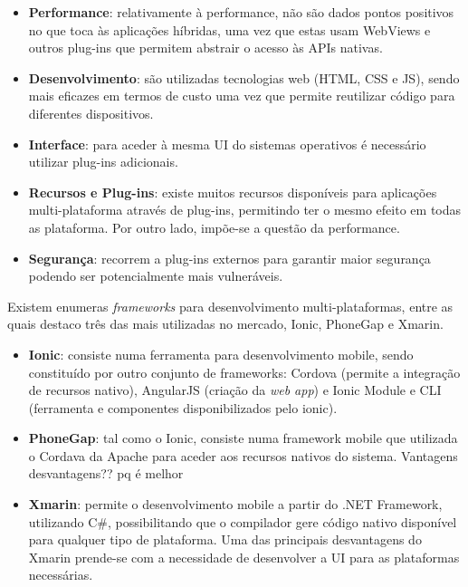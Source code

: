 \begin{itemize}
	\item \textbf{Performance}: relativamente à performance, não são dados pontos positivos no que toca às aplicações híbridas, uma vez que estas usam  WebViews e outros plug-ins que permitem abstrair o acesso às APIs nativas. 

	
	\item \textbf{Desenvolvimento}: são utilizadas tecnologias web (\ac{HTML}, \ac{CSS} e \ac{JS}), sendo mais eficazes em termos de custo uma vez que permite reutilizar código para diferentes dispositivos. 
	
	
	\item \textbf{Interface}: para aceder à mesma \ac{UI} do sistemas operativos é necessário utilizar plug-ins adicionais. 
	
	
	\item \textbf{Recursos e Plug-ins}: existe muitos recursos disponíveis  para aplicações \linebreak multi-plataforma através de plug-ins, permitindo ter o mesmo efeito em todas as plataforma. Por outro lado, impõe-se a questão da performance. 

	
	\item \textbf{Segurança}: recorrem a plug-ins externos para garantir maior segurança podendo ser potencialmente mais vulneráveis.
	
	
\end{itemize}

Existem enumeras \textit{frameworks} para desenvolvimento multi-plataformas, entre as quais destaco três das mais utilizadas no mercado, Ionic, PhoneGap e Xmarin. 

\begin{itemize}
	\item \textbf{Ionic}: consiste numa ferramenta para desenvolvimento mobile, sendo constituído por outro conjunto de frameworks: Cordova (permite a integração de recursos nativo), AngularJS (criação da \textit{web app}) e Ionic Module e CLI (ferramenta e componentes disponibilizados pelo ionic)\cite{Ionic2016}. 
	
	\item \textbf{PhoneGap}: tal como o Ionic, consiste numa framework mobile que utilizada o Cordava da Apache para aceder aos recursos nativos do sistema. Vantagens desvantagens?? pq é melhor 
	
	\item \textbf{Xmarin}: permite o desenvolvimento mobile a partir do .NET Framework, utilizando C\#, possibilitando que o compilador gere código nativo disponível para qualquer tipo de plataforma. Uma das principais desvantagens do Xmarin prende-se com a necessidade de desenvolver a \ac{UI} para as plataformas necessárias. 
\end{itemize}
 


